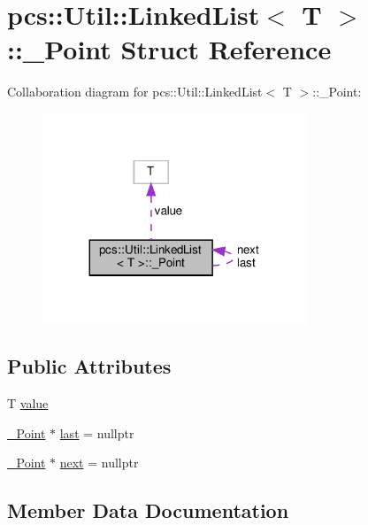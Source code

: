 \hypertarget{structpcs_1_1Util_1_1LinkedList_1_1__Point}{}\section{pcs\+:\+:Util\+:\+:Linked\+List$<$ T $>$\+:\+:\+\_\+\+Point Struct Reference}
\label{structpcs_1_1Util_1_1LinkedList_1_1__Point}


Collaboration diagram for pcs\+:\+:Util\+:\+:Linked\+List$<$ T $>$\+:\+:\+\_\+\+Point\+:\nopagebreak
\begin{figure}[H]
\begin{center}
\leavevmode
\includegraphics[width=224pt]{structpcs_1_1Util_1_1LinkedList_1_1__Point__coll__graph}
\end{center}
\end{figure}
\subsection*{Public Attributes}
\begin{DoxyCompactItemize}
\item 
T \hyperlink{structpcs_1_1Util_1_1LinkedList_1_1__Point_a2006e59eae181a2923dd28c3720c91d0}{value}
\item 
\hyperlink{structpcs_1_1Util_1_1LinkedList_1_1__Point}{\+\_\+\+Point} $\ast$ \hyperlink{structpcs_1_1Util_1_1LinkedList_1_1__Point_a7ce1b0f3d2380f944afd707b7a184b35}{last} = nullptr
\item 
\hyperlink{structpcs_1_1Util_1_1LinkedList_1_1__Point}{\+\_\+\+Point} $\ast$ \hyperlink{structpcs_1_1Util_1_1LinkedList_1_1__Point_ac6608e428bffcb2943d80aa962692cc4}{next} = nullptr
\end{DoxyCompactItemize}


\subsection{Member Data Documentation}
\mbox{\label{structpcs_1_1Util_1_1LinkedList_1_1__Point_a7ce1b0f3d2380f944afd707b7a184b35}} 
